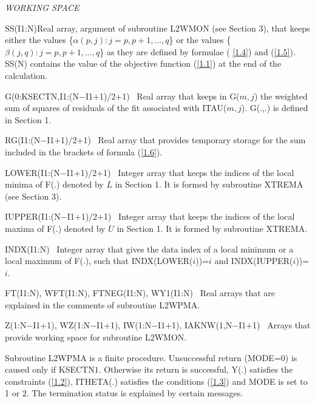 \documentclass[acmtoms]{acmtrans2m}
\begin{document}
\textit{WORKING SPACE}

SS(I1:N)\qquad Real array, argument of subroutine L2WMON (see Section 3),
that keeps either the values \{$\alpha (p,j):j=p,p+1,\ldots ,q$\} or the
values \{$\beta (j,q):j=p,p+1,\ldots ,q$\} as they are defined by formulae (%
\ref{1.4}) and (\ref{1.5}). SS(N) contains the value of the objective
function (\ref{1.1}) at the end of the calculation.

G(0:KSECTN,I1:(N$-$I1+1)/2+1) \ Real array that keeps in G($m,j$) the
weighted sum of squares of residuals of the fit associated with ITAU($m,j$).
G(.,.) is defined in Section 1.

RG(I1:(N$-$I1+1)/2+1) \ Real array that provides temporary storage for the
sum included in the brackets of formula (\ref{1.6}).

LOWER(I1:(N$-$I1+1)/2+1) \ Integer array that keeps the indices of the local
minima of F(.) denoted by $L$ in Section 1. It is formed by subroutine
XTREMA (see Section 3).

IUPPER(I1:(N$-$I1+1)/2+1) \ Integer array that keeps the indices of the
local maxima of F(.) denoted by $U$ in Section 1. It is formed by subroutine
XTREMA.

INDX(I1:N) \ Integer array that gives the data index of a local minimum or a
local maximum of F(.), such that INDX(LOWER($i$))=$i$ and INDX(IUPPER($i$))=$%
i$.

FT(I1:N), WFT(I1:N), FTNEG(I1:N), WY1(I1:N) \ Real arrays that are explained
in the comments of subroutine L2WPMA.

Z(1:N$-$I1+1), WZ(1:N$-$I1+1), IW(1:N$-$I1+1), IAKNW(1,N$-$I1+1) \ Arrays
that provide working space for subroutine L2WMON.

\bigskip

Subroutine L2WPMA is a finite procedure. Unsuccessful return (MODE=0) is
caused only if KSECTN\TEXTsymbol{<}$1$. Otherwise its return is successful,
Y(.) satisfies the constraints (\ref{1.2}), ITHETA(.) satisfies the
conditions (\ref{1.3}) and MODE is set to 1 or 2. The termination status is
explained by certain messages.
\end{document}
